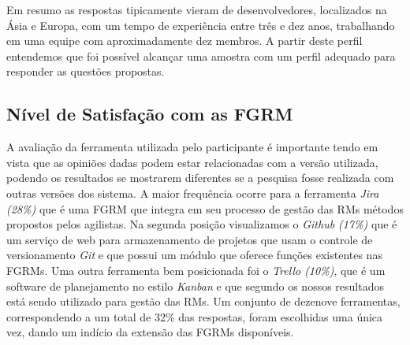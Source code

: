 
Em resumo as respostas tipicamente vieram de desenvolvedores, localizados na
Ásia e Europa, com um tempo de experiência entre três e dez anos, trabalhando em
uma equipe com aproximadamente dez membros. A partir deste perfil entendemos que
foi possível alcançar uma amostra com um perfil adequado para responder as
questões propostas.

\subsection{Nível de Satisfação com as FGRM}
\label{sub:nivel_de_satisfação_com_as_fgrm}

A avaliação da ferramenta utilizada pelo participante é importante tendo em
vista que as opiniões dadas podem estar relacionadas com a versão utilizada,
podendo os resultados se mostrarem diferentes se a pesquisa fosse realizada com
outras versões dos sistema. A maior frequência ocorre para a ferramenta
\textit{Jira (28\%)} que é uma FGRM que integra em seu processo de gestão das
RMs métodos propostos pelos agilistas. Na segunda posição visualizamos o
\textit{Github (17\%)} que é um serviço de web para armazenamento de projetos
que usam o controle de versionamento \textit{Git} e que possui um módulo que
oferece funções existentes nas FGRMs. Uma outra ferramenta bem posicionada foi o
\textit{Trello (10\%)}, que é um software de planejamento no estilo
\textit{Kanban} e que segundo os nossos resultados está sendo utilizado para
gestão das RMs. Um conjunto de dezenove ferramentas, correspondendo a um total
de 32\% das respostas, foram escolhidas uma única vez, dando um indício da
extensão das FGRMs disponíveis.


